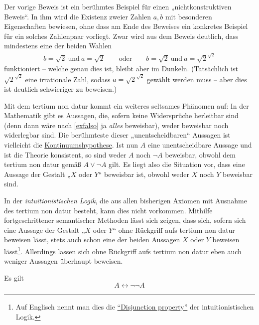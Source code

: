    
\begin{vorschau} \label{nichtkonstruktiv} 
    Der vorige Beweis ist ein berühmtes Beispiel für einen „nichtkonstruktiven Beweis“. In ihm wird die Existenz zweier Zahlen $a,b$ mit besonderen Eigenschaften bewiesen, ohne dass am Ende des Beweises ein konkretes Beispiel für ein solches Zahlenpaar vorliegt. Zwar wird aus dem Beweis deutlich, dass mindestens eine der beiden Wahlen
    \begin{align*}
        b=\sqrt{2}\ \text{und}\ a=\sqrt{2} \qquad \text{oder}\qquad  b=\sqrt{2}\ \text{und}\ a=\sqrt{2}^{\sqrt{2}}
    \end{align*}
    funktioniert -- welche genau dies ist, bleibt aber im Dunkeln. (Tatsächlich ist $\sqrt{2}^{\sqrt{2}}$ eine irrationale Zahl, sodass $a=\sqrt{2}^{\sqrt{2}}$ gewählt werden muss -- aber dies ist deutlich schwieriger zu beweisen.)
    
    Mit dem tertium non datur kommt ein weiteres seltsames Phänomen auf: In der Mathematik gibt es Aussagen, die, sofern keine Widersprüche herleitbar sind (denn dann wäre nach \cref{exfalso} ja \emph{alles} beweisbar), weder beweisbar noch widerlegbar sind. Die berühmteste dieser „unentscheidbaren“ Aussagen ist vielleicht die \href{https://de.wikipedia.org/wiki/Kontinuumshypothese}{Kontinuumshypothese}. Ist nun $A$ eine unentscheidbare Aussage und ist die Theorie konsistent, so sind weder $A$ noch $\neg A$ beweisbar, obwohl dem tertium non datur gemäß $A\lor \neg A$ gilt. Es liegt also die Situation vor, dass eine Aussage der Gestalt „$X$ oder $Y$“ beweisbar ist, obwohl weder $X$ noch $Y$ beweisbar sind.
    
    In der \emph{intuitionistischen Logik}, die aus allen bisherigen Axiomen mit Ausnahme des tertium non datur besteht, kann dies nicht vorkommen. Mithilfe fortgeschrittener semantischer Methoden lässt sich zeigen, dass sich, sofern sich eine Aussage der Gestalt „$X$ oder $Y$“ ohne Rückgriff aufs tertium non datur beweisen lässt, stets auch schon eine der beiden Aussagen $X$ oder $Y$ beweisen lässt\footnote{Auf Englisch nennt man dies die \href{https://en.wikipedia.org/wiki/Disjunction_and_existence_properties}{``Disjunction property''} der intuitionistischen Logik.}. Allerdings lassen sich ohne Rückgriff aufs tertium non datur eben auch weniger Aussagen überhaupt beweisen.
\end{vorschau}

   
\begin{satz} \label{doppelneg}
    Es gilt
    \[ A\leftrightarrow \neg \neg A \]
\end{satz}


